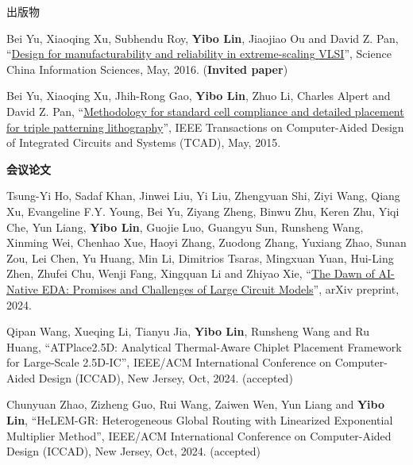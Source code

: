 \begin{rSection}{出版物}
\begin{description}[font=\normalfont, rightmargin=2em]
{}
            

\item[{[J2]}]{
        Bei Yu, Xiaoqing Xu, Subhendu Roy, \textbf{Yibo Lin}, Jiaojiao Ou and David Z. Pan, 
    ``\href{http://link.springer.com/article/10.1007%2Fs11432-016-5560-6}{Design for manufacturability and reliability in extreme-scaling {VLSI}}'', 
    Science China Information Sciences, May, 2016.
    (\textbf{Invited paper})
}
            

\item[{[J1]}]{
        Bei Yu, Xiaoqing Xu, Jhih-Rong Gao, \textbf{Yibo Lin}, Zhuo Li, Charles Alpert and David Z. Pan, 
    ``\href{https://doi.org/10.1109/TCAD.2015.2401571}{Methodology for standard cell compliance and detailed placement for triple patterning lithography}'', 
    IEEE Transactions on Computer-Aided Design of Integrated Circuits and Systems (TCAD), May, 2015.
    
}
            

\end{description}
    

\textbf{会议论文}
        

\begin{description}[font=\normalfont, rightmargin=2em]
    

\item[{[C110]}]{
        Tsung-Yi Ho, Sadaf Khan, Jinwei Liu, Yi Liu, Zhengyuan Shi, Ziyi Wang, Qiang Xu, Evangeline F.Y. Young, Bei Yu, Ziyang Zheng, Binwu Zhu, Keren Zhu, Yiqi Che, Yun Liang, \textbf{Yibo Lin}, Guojie Luo, Guangyu Sun, Runsheng Wang, Xinming Wei, Chenhao Xue, Haoyi Zhang, Zuodong Zhang, Yuxiang Zhao, Sunan Zou, Lei Chen, Yu Huang, Min Li, Dimitrios Tsaras, Mingxuan Yuan, Hui-Ling Zhen, Zhufei Chu, Wenji Fang, Xingquan Li and Zhiyao Xie, 
    ``\href{https://arxiv.org/pdf/2403.07257.pdf}{The Dawn of AI-Native EDA: Promises and Challenges of Large Circuit Models}'', 
    arXiv preprint, 2024.
    
}
            

\item[{[C109]}]{
        Qipan Wang, Xueqing Li, Tianyu Jia, \textbf{Yibo Lin}, Runsheng Wang and Ru Huang, 
    ``ATPlace2.5D: Analytical Thermal-Aware Chiplet Placement Framework for Large-Scale 2.5D-IC'', 
    IEEE/ACM International Conference on Computer-Aided Design (ICCAD), New Jersey, Oct, 2024.
    (accepted)
}
            

\item[{[C108]}]{
        Chunyuan Zhao, Zizheng Guo, Rui Wang, Zaiwen Wen, Yun Liang and \textbf{Yibo Lin}, 
    ``HeLEM-GR: Heterogeneous Global Routing with Linearized Exponential Multiplier Method'', 
    IEEE/ACM International Conference on Computer-Aided Design (ICCAD), New Jersey, Oct, 2024.
    (accepted)
}
            


\end{description}
\end{rSection}
